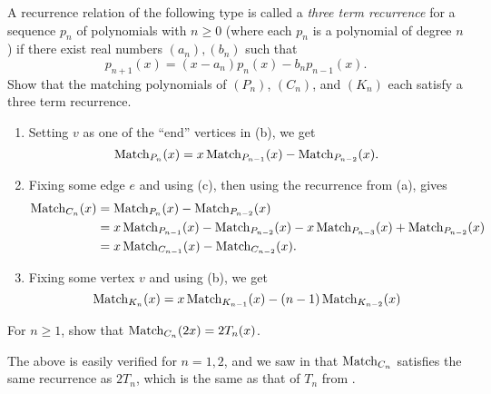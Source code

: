 		\begin{problem}
			\label{problem: three term recurrence matching}
			A recurrence relation of the following type is called a \emph{three term recurrence} for a sequence $p_n$ of polynomials with $n \ge 0$ (where each $p_n$ is a polynomial of degree $n$) if there exist real numbers $(a_n),(b_n)$ such that 
			\[ p_{n+1}(x) = (x-a_n)p_n(x) - b_n p_{n-1}(x). \]
			Show that the matching polynomials of $(P_n)$, $(C_n)$, and $(K_n)$ each satisfy a three term recurrence.
		\end{problem}
		\begin{solution*}
			\begin{enumerate}[label=(\alph*)]
				\item Setting $v$ as one of the ``end'' vertices in (b), we get
				\[ \operatorname{Match}_{P_n}(x) = x\operatorname{Match}_{P_{n-1}}(x) - \operatorname{Match}_{P_{n-2}}(x). \]

				\item Fixing some edge $e$ and using (c), then using the recurrence from (a), gives
				\begin{align*}
					\operatorname{Match}_{C_n}(x) &= \operatorname{Match}_{P_n}(x) - \operatorname{Match}_{P_{n-2}}(x) \\
						&= x\operatorname{Match}_{P_{n-1}}(x) - \operatorname{Match}_{P_{n-2}}(x) - x \operatorname{Match}_{P_{n-3}}(x) + \operatorname{Match}_{P_{n-2}}(x) \\
						&= x\operatorname{Match}_{C_{n-1}}(x) - \operatorname{Match}_{C_{n-2}}(x).
				\end{align*}

				\item Fixing some vertex $v$ and using (b), we get
				\[ \operatorname{Match}_{K_n}(x) = x\operatorname{Match}_{K_{n-1}}(x) - (n-1)\operatorname{Match}_{K_{n-2}}(x) \]
			\end{enumerate}
		\end{solution*}


		\begin{problem}
			For $n \ge 1$, show that $\operatorname{Match}_{C_n}(2x) = 2T_n(x)$.
		\end{problem}
		\begin{solution*}
			The above is easily verified for $n=1,2$, and we saw in  that $\operatorname{Match}_{C_n}$ satisfies the same recurrence as $2T_n$, which is the same as that of $T_n$ from \Cref{prop: recurrence of Tn}.
		\end{solution*}

